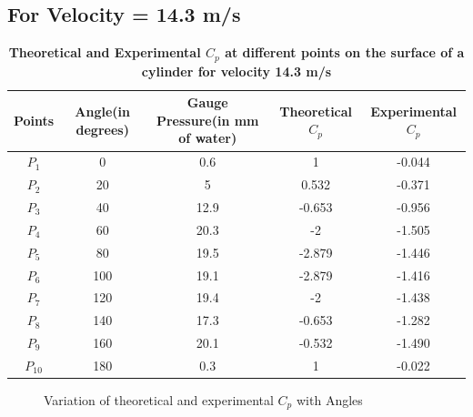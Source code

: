 \documentclass[12pt,a4paper]{article}
\begin{document}
\newpage


\subsection{For Velocity = 14.3 m/s}
\begin{table}[ht]
\centering
\caption{\textbf{Theoretical and Experimental $C_p$ at different points on the surface of a cylinder for velocity 14.3 m/s}}
\vspace{2mm}
\begin{flushleft}
\begin{tabular}{|c|c|c|c|c|} 
 \hline
Points & Angle(in degrees) & Gauge Pressure(in mm of water) & Theoretical $C_p$ & Experimental $C_p$\\ [0.1ex] 
 \hline
$P_1$ & 0 & 0.6  & 1 & -0.044 \\ 
 \hline
$P_2$ & 20 & 5 & 0.532 & -0.371  \\
 \hline
$P_3$ & 40 & 12.9 & -0.653 & -0.956  \\
 \hline
$P_4$ & 60 & 20.3 & -2 & -1.505  \\
 \hline
$P_5$ & 80 & 19.5 & -2.879 & -1.446  \\
 \hline
$P_6$ & 100 & 19.1 & -2.879 & -1.416 \\ 
 \hline
$P_7$ & 120 & 19.4 & -2 & -1.438 \\ 
 \hline
$P_8$ & 140 & 17.3 & -0.653 & -1.282\\
 \hline
$P_9$ & 160 & 20.1 & -0.532 & -1.490\\
 \hline
$P_{10}$ & 180 & 0.3 & 1 & -0.022 \\ 
 \hline 

\end{tabular}
\end{flushleft}
\end{table}




\begin{figure}[!ht]
	\begin{center}
	\end{center}
	\caption{Variation of theoretical and experimental $C_p$ with Angles}
\end{figure}
\end{document}

